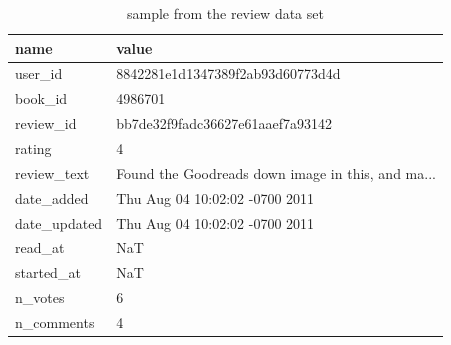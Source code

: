 \documentclass[10pt,final,journal,a4paper,oneside,twocolumn]{IEEEtran}
\begin{document}
\begin{table}
    \label{tab:review_sample}
    \caption{sample from the review data set}
    \begin{tabular}{ll}
        \toprule
        name &                                                  value \\
        \midrule
        user\_id      &                   8842281e1d1347389f2ab93d60773d4d \\
        book\_id      &                                            4986701 \\
        review\_id    &                   bb7de32f9fadc36627e61aaef7a93142 \\
        rating       &                                                  4 \\
        review\_text  &  Found the Goodreads down image in this, and ma... \\
        date\_added   &                     Thu Aug 04 10:02:02 -0700 2011 \\
        date\_updated &                     Thu Aug 04 10:02:02 -0700 2011 \\
        read\_at      &                                                NaT \\
        started\_at   &                                                NaT \\
        n\_votes      &                                                  6 \\
        n\_comments   &                                                  4 \\
        \bottomrule
        \end{tabular}
        
\end{table}
\end{document}
